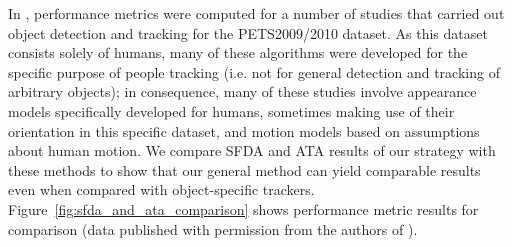 \documentclass[smallcondensed, final]{svjour3}
\begin{document}
In \cite{ellis_2010}, performance metrics were computed for a number of studies that carried out object detection and tracking for the PETS2009/2010 dataset. As this dataset consists solely of humans, many of these algorithms were developed for the specific purpose of people tracking (i.e. not for general detection and tracking of arbitrary objects); in consequence, many of these studies involve appearance models specifically developed for humans, sometimes making use of their orientation in this specific dataset, and motion models based on assumptions about human motion. We compare SFDA and ATA results of our strategy with these methods to show that our general method can yield comparable results even when compared with object-specific trackers. Figure~\ref{fig:sfda_and_ata_comparison} shows performance metric results for comparison (data published with permission from the authors of \cite{ellis_2010}).
\end{document}
